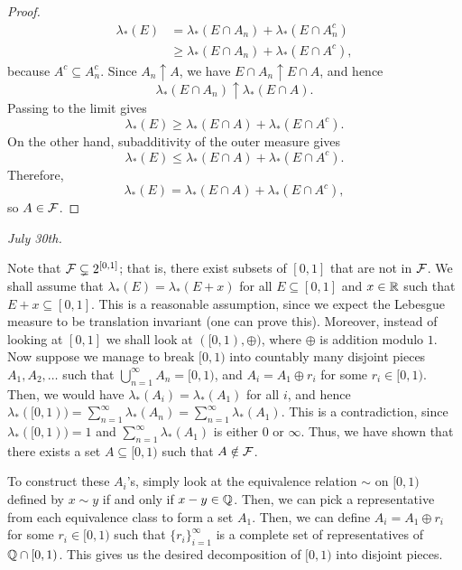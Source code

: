 \begin{proof}
    \begin{align}
        \lambda_{\ast}(E)
        &= \lambda_{\ast}(E\cap A_n) + \lambda_{\ast}(E\cap A_n^{c}) \\
        &\ge \lambda_{\ast}(E\cap A_n) + \lambda_{\ast}(E\cap A^{c}),
    \end{align}
    because $A^{c} \subseteq A_n^{c}$. Since $A_n \uparrow A$, we have $E\cap A_n \uparrow E\cap A$, and hence
    \[
    \lambda_{\ast}(E\cap A_n) \uparrow \lambda_{\ast}(E\cap A).
    \]
    Passing to the limit gives
    \[
    \lambda_{\ast}(E) \ge \lambda_{\ast}(E\cap A) + \lambda_{\ast}(E\cap A^{c}).
    \]
    On the other hand, subadditivity of the outer measure gives
    \[
    \lambda_{\ast}(E) \le \lambda_{\ast}(E\cap A) + \lambda_{\ast}(E\cap A^{c}).
    \]
    Therefore,
    \[
    \lambda_{\ast}(E)=\lambda_{\ast}(E\cap A)+\lambda_{\ast}(E\cap A^{c}),
    \]
    so $A\in\mathcal{F}$.
\end{proof}

\noindent \textit{July 30th.}

Note that $\mathcal{F} \subsetneq 2^{[0,1]}$; that is, there exist subsets of $[0,1]$ that are not in $\mathcal{F}$. We shall assume that $\lambda_{\ast}(E) = \lambda_{\ast}(E+x)$ for all $E \subseteq [0,1]$ and $x \in \mathbb{R}$ such that $E+x \subseteq [0,1]$. This is a reasonable assumption, since we expect the Lebesgue measure to be translation invariant (one can prove this). Moreover, instead of looking at $[0,1]$ we shall look at $([0,1),\oplus)$, where $\oplus$ is addition modulo $1$. Now suppose we manage to break $[0,1)$ into countably many disjoint pieces $A_{1},A_{2},\ldots$ such that $\bigcup_{n=1}^{\infty}A_{n} = [0,1)$, and $A_{i} = A_{1} \oplus r_{i}$ for some $r_{i} \in [0,1)$. Then, we would have $\lambda_{\ast}(A_{i}) = \lambda_{\ast}(A_{1})$ for all $i$, and hence $\lambda_{\ast}([0,1)) = \sum_{n=1}^{\infty}\lambda_{\ast}(A_{n}) = \sum_{n=1}^{\infty}\lambda_{\ast}(A_{1})$. This is a contradiction, since $\lambda_{\ast}([0,1)) = 1$ and $\sum_{n=1}^{\infty}\lambda_{\ast}(A_{1})$ is either $0$ or $\infty$. Thus, we have shown that there exists a set $A \subseteq [0,1)$ such that $A \notin \mathcal{F}$.

To construct these $A_{i}$'s, simply look at the equivalence relation $\sim$ on $[0,1)$ defined by $x \sim y$ if and only if $x-y \in \mathbb{Q}$. Then, we can pick a representative from each equivalence class to form a set $A_{1}$. Then, we can define $A_{i} = A_{1} \oplus r_{i}$ for some $r_{i} \in [0,1)$ such that $\{r_{i}\}_{i=1}^{\infty}$ is a complete set of representatives of $\mathbb{Q} \cap [0,1)$. This gives us the desired decomposition of $[0,1)$ into disjoint pieces.

